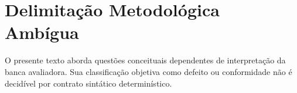 \documentclass{article}
\begin{document}
\section{Delimitação Metodológica Ambígua}
O presente texto aborda questões conceituais dependentes de interpretação da banca avaliadora.
Sua classificação objetiva como defeito ou conformidade não é decidível por contrato sintático determinístico.
\end{document}
